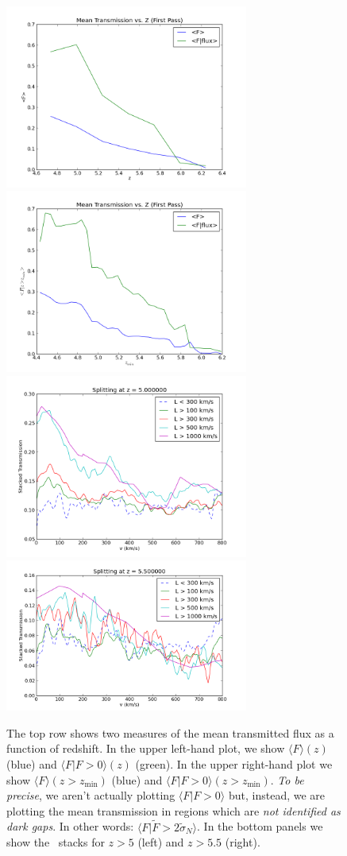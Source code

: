 \documentclass[11pt]{article}
\begin{document}
\begin{figure}[h]
  \centering
  \includegraphics[width=8cm]{meanFs.png}
  \includegraphics[width=8cm]{FluxCDF.png}
  \includegraphics[width=8cm]{Stack_Zgreaterthan5.png}
  \includegraphics[width=8cm]{Stack_Zgreaterthan5p5.png}
  \caption{The top row shows two measures of the mean transmitted flux as a function of redshift. In the upper left-hand plot, we show $\langle F \rangle(z)$ (blue) and $\langle F | F > 0 \rangle(z)$ (green). In the upper right-hand plot we show $\langle F \rangle(z>z_{\text{min}})$ (blue) and $\langle F | F > 0 \rangle(z>z_{\text{min}})$. \textit{To be precise}, we aren't actually plotting $\langle F | F > 0\rangle$ but, instead, we are plotting the mean transmission in regions which are \textit{not identified as dark gaps}. In other words: $\langle F | \tilde{F} > 2\tilde{\sigma}_{N}\rangle$. In the bottom panels we show the \lya\ stacks for $z > 5$ (left) and $z > 5.5$ (right). }
  \label{fig:todo}
\end{figure}
\end{document}
